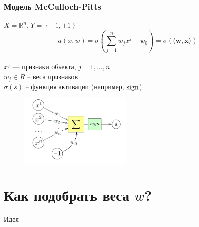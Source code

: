 \documentclass[10pt]{beamer}
\begin{document}
\begin{frame}\frametitle{Модель McCulloch-Pitts}
  $X = \mathbb{R}^n$, ${Y = \left\{ -1, + 1\right\}}$\\
	\pause
	$$a(x,w) = \sigma(\sum\limits_{j=1}^n w_j x^j - w_0) = \sigma(\langle \mathbf{w}, \mathbf{x} \rangle)$$\\
  $x^j$ — признаки объекта, $j = 1,\dots, n$ \\	
	$w_j \in R$ -- веса признаков\\
	$\sigma(s)$ -- функция активации (например, $\operatorname{sign}$)
	\pause
	\begin{figure}[htbp]
	  \includegraphics[height=100pt, keepaspectratio = true]{images/neuron-scheme}   
	\end{figure}
\end{frame}

\section{Как подобрать веса $w$?}

\begin{frame}{Идея}
  \begin{figure}%
    \centering
    \qquad
  \end{figure}
\end{frame}
\end{document}
